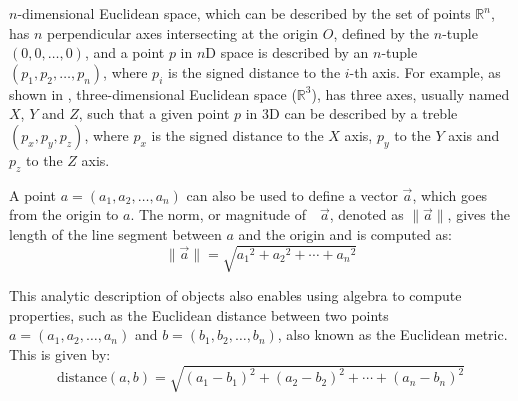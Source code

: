 $n$-dimensional Euclidean space, which can be described by the set of points $\mathbb{R}^n$, has $n$ perpendicular axes intersecting at the origin $O$, defined by the $n$-tuple $(0, 0, \ldots, 0)$, and a point $p$ in $n$D space is described by an $n$-tuple $(p_1, p_2, \ldots, p_n)$, where $p_i$ is the signed distance to the $i$-th axis.
For example, as shown in , three-dimensional Euclidean space ($\mathbb{R}^3$), has three axes, usually named $X$, $Y$ and $Z$, such that a given point $p$ in 3D can be described by a treble $(p_x,p_y,p_z)$, where $p_x$ is the signed distance to the $X$ axis, $p_y$ to the $Y$ axis and $p_z$ to the $Z$ axis.

A point $a = (a_1, a_2, \ldots, a_n)$ can also be used to define a vector $\vec{a}$, which goes from the origin to $a$.
The norm, or magnitude of\ \ $\vec{a}$, denoted as $\| \vec{a} \|$, gives the length of the line segment between $a$ and the origin and is computed as:
\begin{equation*}
\| \vec{a} \| = \sqrt{{a_1}^{2} + {a_2}^{2} + \cdots + {a_n}^{2}}
\end{equation*}

This analytic description of objects also enables using algebra to compute properties, such as the Euclidean distance between two points $a = (a_1, a_2, \ldots, a_n)$ and $b = (b_1, b_2, \ldots, b_n)$, also known as the Euclidean metric.
This is given by:
\begin{equation*}
\mathrm{distance}(a,b) = \sqrt{{(a_1 - b_1)}^{2} + {(a_2 - b_2)}^{2} + \cdots + {(a_n - b_n)}^{2}}
\end{equation*}

